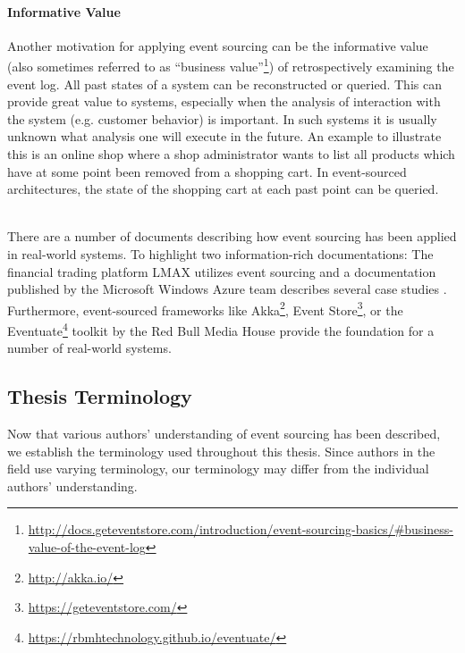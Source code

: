 \paragraph{Informative Value}{
Another motivation for applying event sourcing can be the informative value
(also sometimes referred to as ``business value''\footnote[1]{\href{http://docs.geteventstore.com/introduction/event-sourcing-basics/\#business-value-of-the-event-log}{http://docs.geteventstore.com/introduction/event-sourcing-basics/\#business-value-of-the-event-log}
}) of retrospectively examining the event log. All past states of a system 
can be reconstructed or queried. 
This can provide great value to systems, especially when the analysis of 
interaction with the system (e.g. customer behavior) is important. In such 
systems it is usually unknown what analysis one will execute in the future.
An example to illustrate this is an online shop where a shop administrator 
wants to list all products which have at some point been removed from a 
shopping cart. In event-sourced architectures, the state of the shopping 
cart at each past point can be queried.
}

\ \\
There are a number of documents describing how event sourcing has been applied 
in real-world systems. To highlight two information-rich documentations:
The financial trading platform LMAX utilizes event sourcing \cite{Fowler2011}
and a documentation published by the Microsoft Windows Azure team describes several 
case studies \cite{Betts2013}.
Furthermore, event-sourced frameworks like Akka\footnote[2]{\href{http://akka.io/}{http://akka.io/}}, 
Event Store\footnote[3]{\href{https://geteventstore.com/}{https://geteventstore.com/}}, or the Eventuate\footnote[4]{\href{https://rbmhtechnology.github.io/eventuate/}{https://rbmhtechnology.github.io/eventuate/}} 
toolkit by the Red Bull Media House provide the foundation for a number of 
real-world systems. 
 
\subsection{Thesis Terminology}
\label{sec:thesis-vocabulary}
Now that various authors' understanding of event sourcing has been described,
we establish the terminology used throughout this thesis. Since authors in the 
field use varying terminology, our terminology may differ from the individual 
authors' understanding.

